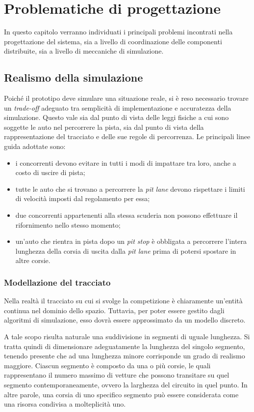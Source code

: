 \chapter{Problematiche di progettazione}
\label{ch:problematiche}

In questo capitolo verranno individuati i principali problemi incontrati nella progettazione del sistema, sia a livello di coordinazione delle componenti distribuite, sia a livello di meccaniche di simulazione.

\section{Realismo della simulazione}
Poiché il prototipo deve simulare una situazione reale, si è reso necessario trovare un \textit{trade-off} adeguato tra semplicità di implementazione e accuratezza della simulazione. Questo vale sia dal punto di vista delle leggi fisiche a cui sono soggette le auto nel percorrere la pista, sia dal punto di vista della rappresentazione del tracciato e delle sue regole di percorrenza. Le principali linee guida adottate sono:
\begin{itemize}
\item i concorrenti devono evitare in tutti i modi di impattare tra loro, anche a costo di uscire di pista;
\item tutte le auto che si trovano a percorrere la \textit{pit lane} devono rispettare i limiti di velocità imposti dal regolamento per essa;
\item due concorrenti appartenenti alla stessa scuderia non possono effettuare il rifornimento nello stesso momento;
\item un'auto che rientra in pista dopo un \textit{pit stop} è obbligata a percorrere l'intera lunghezza della corsia di uscita dalla \textit{pit lane} prima di potersi spostare in altre corsie.
\end{itemize}

\subsection*{Modellazione del tracciato}
Nella realtà il tracciato su cui si svolge la competizione è chiaramente un'entità continua nel dominio dello spazio. Tuttavia, per poter essere gestito dagli algoritmi di simulazione, esso dovrà essere approssimato da un modello discreto.

A tale scopo risulta naturale una suddivisione in segmenti di uguale lunghezza. Si tratta quindi di dimensionare adeguatamente la lunghezza del singolo segmento, tenendo presente che ad una lunghezza minore corrisponde un grado di realismo maggiore. Ciascun segmento è composto da una o più corsie, le quali rappresentano il numero massimo di vetture che possono transitare su quel segmento contemporaneamente, ovvero la larghezza del circuito in quel punto. In altre parole, una corsia di uno specifico segmento può essere considerata come una risorsa condivisa a molteplicità uno.

